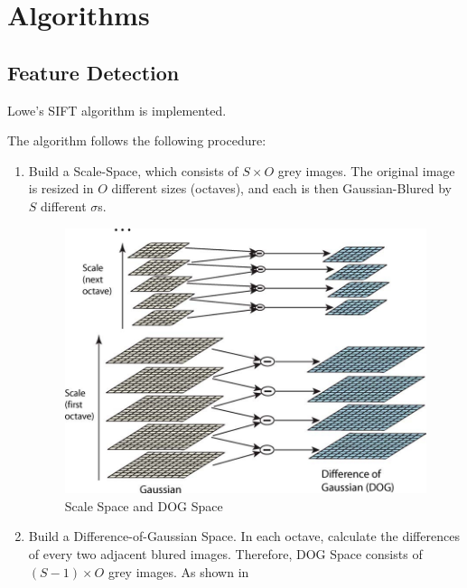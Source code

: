 
\section{Algorithms}
\subsection{Feature Detection}
Lowe's SIFT algorithm\cite{sift} is implemented.

The algorithm follows the following procedure:
\begin{enumerate}
  \item Build a Scale-Space, which consists of $ S \times O$ grey images.
    The original image is resized in $ O$ different sizes (octaves), and each is then Gaussian-Blured
    by $ S$ different $ \sigma$s.
    \begin{figure}[H]
      \centering
      \includegraphics[scale=0.3]{res/dog.png}
      \caption{Scale Space and DOG Space \label{fig:dog}}
    \end{figure}

  \item Build a Difference-of-Gaussian Space.
    In each octave, calculate the differences of every two adjacent blured images.
    Therefore, DOG Space consists of $ (S - 1) \times O$ grey images.
    As shown in 


\end{enumerate}
